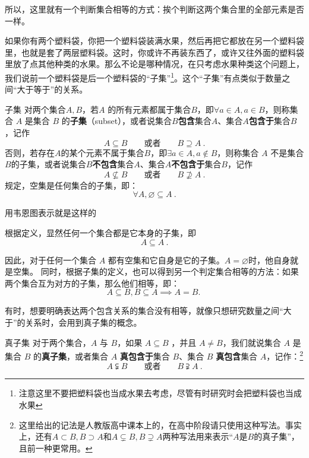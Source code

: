 所以，这里就有一个判断集合相等的方式：挨个判断这两个集合里的全部元素是否一样。

如果你有两个塑料袋，你把一个塑料袋装满水果，然后再把它都放在另一个塑料袋里，也就是套了两层塑料袋。这时，你或许不再装东西了，或许又往外面的塑料袋里放了点其他种类的水果。那么不论是哪种情况，在只考虑水果种类这个问题上，我们说前一个塑料袋是后一个塑料袋的“子集”\footnote{注意这里不要把塑料袋也当成水果去考虑，尽管有时研究时会把塑料袋也当成水果}。这个“子集”有点类似于数量之间“大于等于”的关系。

\begin{definition}{子集}
对两个集合$A,B$，若$A$ 的所有元素都属于集合$B$，即$\forall a\in A,a\in B$，则称集合 $A$ 是集合 $B$ 的\textbf{子集}（subset），或者说集合$B$\textbf{包含}集合$A$、集合$A$\textbf{包含于}集合$B$，记作
\begin{equation}
A \subseteq B\qquad\text{或者}\qquad B \supseteq A~.
\end{equation}
否则，若存在$A$的某个元素不属于集合$B$，即$\exists a\in A,a\notin B$，则称集合 $A$ 不是集合$B$的子集，或者说集合$B$\textbf{不包含}集合$A$、集合$A$\textbf{不包含于}集合$B$，记作
\begin{equation}
A \nsubseteq B\qquad\text{或者}\qquad B \nsupseteq A~.
\end{equation}
规定，空集是任何集合的子集，即：
\begin{equation}
\forall A,\varnothing \subseteq A~.
\end{equation}
\end{definition}

用韦恩图表示就是这样的

根据定义，显然任何一个集合都是它本身的子集，即
\begin{equation}
A \subseteq A~.
\end{equation}

因此，对于任何一个集合 $A$ 都有空集和它自身是它的子集。$A=\varnothing$时，他自身就是空集。
同时，根据子集的定义，也可以得到另一个判定集合相等的方法：如果两个集合互为对方的子集，那么他们相等，即：
\begin{equation}
A\subseteq B,B\subseteq A\implies A=B.~
\end{equation}

有时，想要明确表达两个包含关系的集合没有相等，就像只想研究数量之间“大于”的关系时，会用到真子集的概念。

\begin{definition}{真子集}
对于两个集合，$A$ 与 $B$，如果 $A\subseteq B$ ，并且 $A \ne B$，我们就说集合 $A$ 是集合 $B$ 的\textbf{真子集}，或者集合 $A$ \textbf{真包含于}集合 $B$、集合 $B$ \textbf{真包含}集合 $A$，记作：\footnote{这里给出的记法是人教版高中课本上的，在高中阶段请只使用这种写法。事实上，还有$A\subset B,B\supset A$和$A\subsetneq B,B\supsetneq A$两种写法用来表示“$A$是$B$的真子集”，且前一种更常用。}
\begin{equation}
A \subsetneqq B\qquad\text{或者}\qquad B \supsetneqq A~.
\end{equation}
\end{definition}

